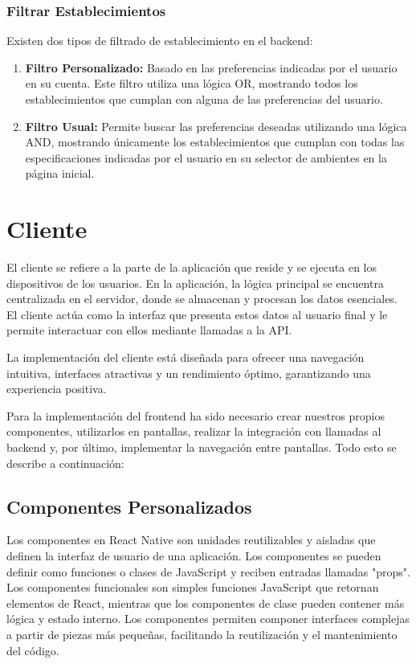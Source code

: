 \subsubsection{Filtrar Establecimientos}

Existen dos tipos de filtrado de establecimiento en el backend:

\begin{enumerate}
    \item \textbf{Filtro Personalizado: } Basado en las preferencias indicadas por el usuario en su cuenta. Este filtro utiliza una lógica OR, mostrando todos los establecimientos que cumplan con alguna de las preferencias del usuario.
    \item \textbf{Filtro Usual: } Permite buscar las preferencias deseadas utilizando una lógica AND, mostrando únicamente los establecimientos que cumplan con todas las especificaciones indicadas por el usuario en su selector de ambientes en la página inicial.
\end{enumerate}

\section{Cliente}

El cliente se refiere a la parte de la aplicación que reside y se ejecuta en los dispositivos de los usuarios. En la aplicación, la lógica principal se encuentra centralizada en el servidor, donde se almacenan y procesan los datos esenciales. El cliente actúa como la interfaz que presenta estos datos al usuario final y le permite interactuar con ellos mediante llamadas a la API.

La implementación del cliente está diseñada para ofrecer una navegación intuitiva, interfaces atractivas y un rendimiento óptimo, garantizando una experiencia positiva.

Para la implementación del frontend ha sido necesario crear nuestros propios componentes, utilizarlos en pantallas, realizar la integración con llamadas al backend y, por último, implementar la navegación entre pantallas. Todo esto se describe a continuación:

\subsection{Componentes Personalizados}

Los componentes en React Native son unidades reutilizables y aisladas que definen la interfaz de usuario de una aplicación. Los componentes se pueden definir como funciones o clases de JavaScript y reciben entradas llamadas "props". Los componentes funcionales son simples funciones JavaScript que retornan elementos de React, mientras que los componentes de clase pueden contener más lógica y estado interno. Los componentes permiten componer interfaces complejas a partir de piezas más pequeñas, facilitando la reutilización y el mantenimiento del código. \cite{react}

